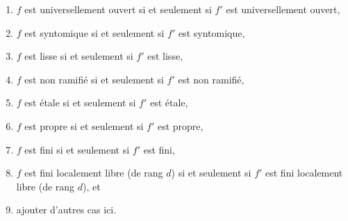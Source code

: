 \begin{lemma}
\begin{enumerate}
\item $f$ est universellement ouvert si et seulement si $f'$ est universellement ouvert,
\label{item-universally-open-fp-over-ft}
\item $f$ est syntomique si et seulement si $f'$ est syntomique,
\label{item-syntomic-fp-over-ft}
\item $f$ est lisse si et seulement si $f'$ est lisse,
\label{item-smooth-fp-over-ft}
\item $f$ est non ramifié si et seulement si $f'$ est non ramifié,
\label{item-unramified-fp-over-ft}
\item $f$ est étale si et seulement si $f'$ est étale,
\label{item-etale-fp-over-ft}
\item $f$ est propre si et seulement si $f'$ est propre,
\label{item-proper-fp-over-ft}
\item $f$ est fini si et seulement si $f'$ est fini,
\label{item-finite-fp-over-ft}
\item
\label{item-finite-locally-free-fp-over-ft}
$f$ est fini localement libre (de rang $d$) si et seulement si $f'$
est fini localement libre (de rang $d$), et
\item ajouter d'autres cas ici.
\end{enumerate}
\end{lemma}

